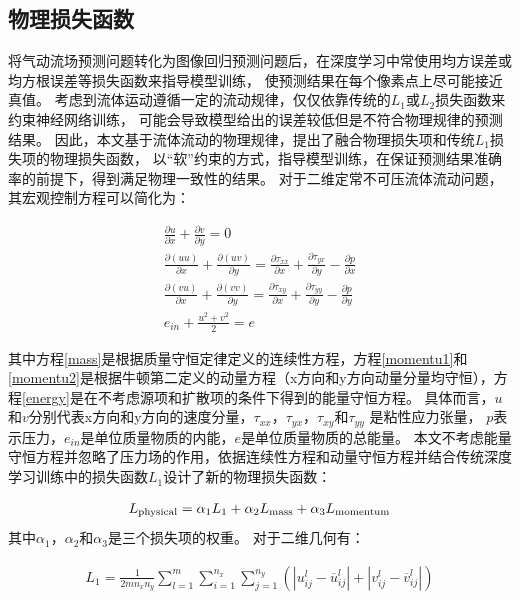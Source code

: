 \subsection{物理损失函数}
将气动流场预测问题转化为图像回归预测问题后，在深度学习中常使用均方误差或均方根误差等损失函数来指导模型训练，
使预测结果在每个像素点上尽可能接近真值。
考虑到流体运动遵循一定的流动规律，仅仅依靠传统的$L_1$或$L_2$损失函数来约束神经网络训练，
可能会导致模型给出的误差较低但是不符合物理规律的预测结果。
因此，本文基于流体流动的物理规律，提出了融合物理损失项和传统$L_1$损失项的物理损失函数，
以“软”约束的方式，指导模型训练，在保证预测结果准确率的前提下，得到满足物理一致性的结果。
对于二维定常不可压流体流动问题，其宏观控制方程可以简化为：

\begin{align}
	\frac{\partial u}{\partial x}+\frac{\partial v}{\partial y}=0 
	\label{mass}\\
	\frac{\partial(u u)}{\partial x}+\frac{\partial(u v)}{\partial y}=\frac{\partial \tau_{x x}}{\partial x}+\frac{\partial \tau_{y x}}{\partial y}-\frac{\partial p}{\partial x} 
	\label{momentu1}\\
	\frac{\partial(v u)}{\partial x}+\frac{\partial(v v)}{\partial y}=\frac{\partial \tau_{x y}}{\partial x}+\frac{\partial \tau_{y y}}{\partial y}-\frac{\partial p}{\partial y} 
	\label{momentu2}\\
	e_{i n}+\frac{u^{2}+v^{2}}{2}=e \label{energy}
\end{align}

\noindent 其中方程\ref{mass}是根据质量守恒定律定义的连续性方程，方程\ref{momentu1}和\ref{momentu2}是根据牛顿第二定义的动量方程（x方向和y方向动量分量均守恒），方程\ref{energy}是在不考虑源项和扩散项的条件下得到的能量守恒方程。
具体而言，$u$和$v$分别代表x方向和y方向的速度分量，$\tau _{xx}$，$\tau _{yx}$，$\tau _{xy}$和$\tau _{yy}$
是粘性应力张量， $p$表示压力，${e_{in}}$是单位质量物质的内能，$e$是单位质量物质的总能量。
本文不考虑能量守恒方程并忽略了压力场的作用，依据连续性方程和动量守恒方程并结合传统深度学习训练中的损失函数$L_1$设计了新的物理损失函数：

\begin{align}
	L_{{\rm{physical}}} = {\alpha _1}{L_1} + {\alpha _2}{L_{{\rm{mass}}}} + {\alpha _3}{L_{{\rm{momentum}}}}
\end{align}
\noindent 其中${\alpha _1}$，${\alpha _2}$和${\alpha _3}$是三个损失项的权重。
对于二维几何有：

\begin{align}
	{{L_1} = \frac{1}{{2m{n_x}{n_y}}}\sum\limits_{l = 1}^m {\sum\limits_{i = 1}^{{n_x}} {\sum\limits_{j = 1}^{{n_y}} {\left( {\left| {u_{ij}^l - \overline u _{ij}^l} \right| + \left| {v_{ij}^l - \overline v _{ij}^l} \right|} \right)} } } }
\end{align}

